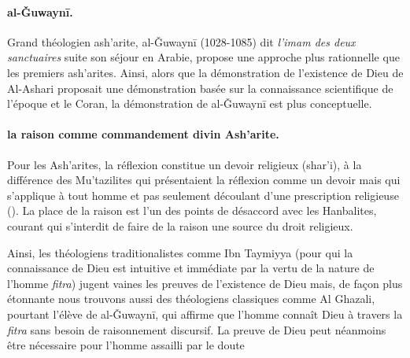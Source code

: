 \paragraph{al-Ǧuwaynī.} Grand théologien ash'arite, al-Ǧuwaynī (1028-1085) dit \textit{l'imam des deux sanctuaires}  suite son séjour en Arabie, propose une approche plus rationnelle que les premiers ash'arites. Ainsi, alors que la démonstration de l'existence de Dieu de Al-Ashari proposait une démonstration basée sur la connaissance scientifique de l'époque et le Coran, la démonstration de al-Ǧuwaynī est plus conceptuelle.


\paragraph{la raison comme commandement divin Ash'arite.} Pour les Ash'arites, la réflexion constitue un devoir religieux (shar'i), à la différence des Mu'tazilites qui présentaient la réflexion comme un devoir mais qui s'applique à tout homme et pas seulement découlant d'une prescription religieuse (\cite{Cambridge:ClassicalIslamicTheology}). La place de la raison est l'un des points de désaccord avec les Hanbalites, courant qui s'interdit de faire de la raison une source du droit religieux. 

Ainsi, les théologiens traditionalistes comme Ibn Taymiyya  (pour qui la connaissance de Dieu est intuitive et immédiate par la vertu de la nature de l'homme \emph{fitra})   jugent vaines les preuves de l'existence de Dieu mais, de façon plus étonnante nous trouvons aussi des théologiens classiques comme Al Ghazali, pourtant l'élève de al-Ǧuwaynī, qui affirme que l'homme connaît Dieu à travers la \textit{fitra} sans besoin de raisonnement discursif. La preuve de Dieu peut néanmoins être nécessaire pour l'homme assailli par le doute \cite[p.197]{Cambridge:ClassicalIslamicTheology}


